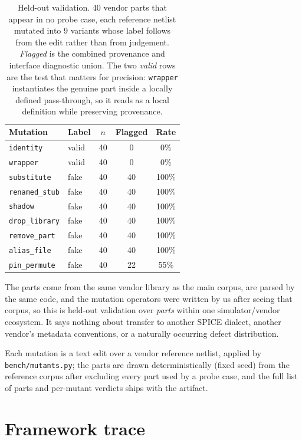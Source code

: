 \begin{table}[t]
\centering
\caption{Held-out validation. 40 vendor parts
  that appear in no probe case, each reference netlist mutated into
  9 variants whose label follows
  from the edit rather than from judgement. \emph{Flagged} is the combined
  provenance and interface diagnostic union. The two \emph{valid} rows are
  the test that matters for
  precision: \texttt{wrapper} instantiates the genuine part inside a locally
  defined pass-through, so it reads as a local definition while preserving
  provenance.}
\label{tab:mutants}
\small
\begin{tabular}{@{}llccc@{}}
\toprule
\textbf{Mutation} & \textbf{Label} & \textbf{$n$} & \textbf{Flagged} &
  \textbf{Rate} \\
\midrule
\texttt{identity} & valid & 40 & 0 & 0\% \\
\texttt{wrapper} & valid & 40 & 0 & 0\% \\
\texttt{substitute} & fake & 40 & 40 & 100\% \\
\texttt{renamed\_stub} & fake & 40 & 40 & 100\% \\
\texttt{shadow} & fake & 40 & 40 & 100\% \\
\texttt{drop\_library} & fake & 40 & 40 & 100\% \\
\texttt{remove\_part} & fake & 40 & 40 & 100\% \\
\texttt{alias\_file} & fake & 40 & 40 & 100\% \\
\texttt{pin\_permute} & fake & 40 & 22 & 55\% \\
\bottomrule
\end{tabular}
\end{table}

The parts come from the same vendor library as the main corpus, are parsed by
the same code, and the mutation operators were written by us after seeing that
corpus, so this is held-out validation over \emph{parts} within one
simulator/vendor ecosystem. It says nothing about transfer to another SPICE
dialect, another vendor's metadata conventions, or a naturally occurring
defect distribution.

Each mutation is a text edit over a vendor reference netlist, applied by
\texttt{bench/mutants.py}; the parts are drawn deterministically (fixed seed)
from the reference corpus after excluding every part used by a probe case, and
the full list of parts and per-mutant verdicts ships with the artifact.

\section{Framework trace}
\label{app:trace}

